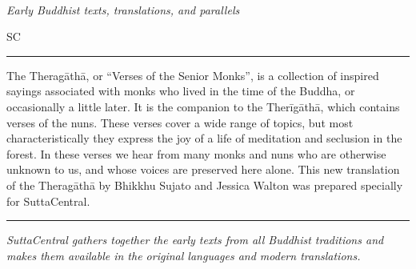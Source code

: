 \documentclass{article}
\makeatletter
\renewenvironment{quote}
               {\list{}{\listparindent=0pt%
                        \itemindent    \listparindent
                        \leftmargin=1.125in%
                        \rightmargin=1in%
                        \topsep=0pt%
                        \parsep        \z@ \@plus\p@}%
                \item\relax}
               {\endlist}
\makeatother
\begin{document}
\fboxsep=0pt%
\colorbox{pastel-yellow}{\parbox[c][1.075in][c]{1\textwidth}{%
\begin{minipage}[c][1.075in]{6.125in}
\vspace{0.47in}\begin{quote}\textcolor{cool-blue}{}\\
\textcolor{dark-medium-gray}{\itshape\footnotesize Early Buddhist texts, translations, and parallels}\end{quote}\hspace{0.1em}
\end{minipage}\begin{minipage}[c][1.075in]{0.457in}\vspace{0.125in}
\centering \textcolor{cool-blue}{SC}
\end{minipage}\begin{minipage}[c][1.075in]{6.125in}
\hspace{0.1em}
\end{minipage}
\endtabular}}%
\textcolor{dark-saturated-red}{\hrule height 0.05in}
\begin{minipage}[c][7in]{6.125in}

\vfill
\begin{quote}
The Theragāthā, or “Verses of the Senior Monks”, is a collection of inspired sayings associated with monks who lived in the time of the Buddha, or occasionally a little later. It is the companion to the Therīgāthā, which contains verses of the nuns. These verses cover a wide range of topics, but most characteristically they express the joy of a life of meditation and seclusion in the forest. In these verses we hear from many monks and nuns who are otherwise unknown to us, and whose voices are preserved here alone. This new translation of the Theragāthā by Bhikkhu Sujato and Jessica Walton was prepared specially for SuttaCentral.
\end{quote}
\vfill

\noindent\hfil\rule{0.3333333\textwidth}{.4pt}\hfil



\begin{center}
\vfill
\begin{quote}
\textit{SuttaCentral gathers together the early texts from all Buddhist traditions and makes them available in the original languages and modern translations.}
\end{quote}
\vfill
\end{center}


\end{minipage}
\end{document}

